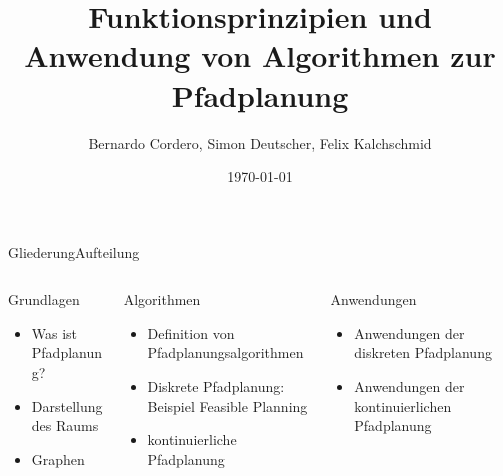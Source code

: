 \documentclass[t,aspectratio=169,dvipsnames]{beamer}
\title{Funktionsprinzipien und Anwendung von Algorithmen zur Pfadplanung}
\author{Bernardo Cordero, Simon Deutscher, Felix Kalchschmid}							%
\institute{Hochschule Trier}
\date{\today}
\begin{document}
\begin{frame}
	\titlepage
\end{frame}

	\begin{frame}{Gliederung}{Aufteilung}
		\begin{columns}[T]
			\begin{column}[T]{0.33\textwidth}
			\begin{alertblock}{Grundlagen}
				\begin{itemize}
					\item Was ist Pfadplanung?
					\item Darstellung des Raums
					\item Graphen
					\newline\newline\newline
				\end{itemize}
			\end{alertblock}
			\end{column}
			\begin{column}[T]{0.33\textwidth}
				\begin{block}{Algorithmen}
				\begin{itemize}
					\item Definition von Pfadplanungsalgorithmen
					\item Diskrete Pfadplanung: Beispiel Feasible Planning
					\item kontinuierliche Pfadplanung
				\end{itemize}
			\end{block}
			\end{column}
		\begin{column}[T]{0.33\textwidth}
			\begin{block}{Anwendungen}
			\begin{itemize}
				\item Anwendungen der diskreten Pfadplanung
				\item Anwendungen der kontinuierlichen Pfadplanung
				\newline\newline
			\end{itemize}		
		\end{block}
		\end{column}
		\end{columns}	
	\end{frame}


\end{document}
